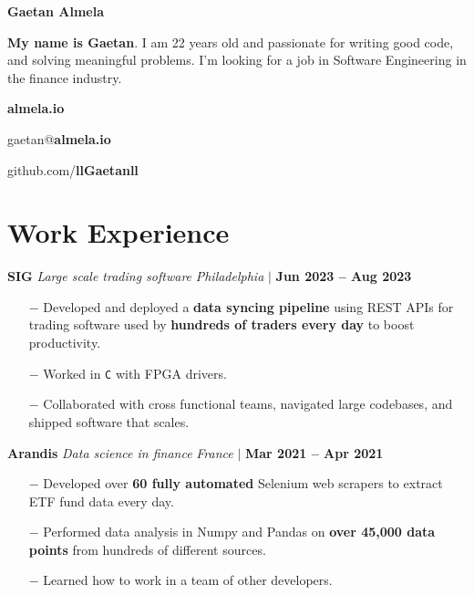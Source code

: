 \documentclass[12pt]{article}
\newcommand{\bigtitle}[5]{
  {\bf \large #1} \textemdash{} {\large \it #2} \hfill {#3}

  {\small #4}

  \smallskip

  {#5} %

  \medskip
}
\begin{document}
    {\fontsize{40}{50} \selectfont \bf \intertabular Gaetan Almela}

    \smallskip

    {\bf My name is Gaetan}. I am 22 years old and passionate for writing good
    code, and solving meaningful problems. I'm looking for a job in Software
    Engineering in the finance industry.

    \begin{center}
      \begin{multicols}{3}
       {\bf almela.io}

       gaetan@{\bf almela.io}

       github.com/{\bf llGaetanll}
      \end{multicols}
    \end{center}

    \section{Work Experience}

    \smallskip

    \bigtitle{SIG}{Large scale trading software}
    {
      \textit{Philadelphia} $\big|$ \textbf{Jun 2023 -- Aug 2023}
    }
    {}
    {
      \begin{itemize}
        \item[$-$] Developed and deployed a {\bf data syncing pipeline} using
          REST APIs for trading software used by {\bf hundreds of traders every
          day} to boost productivity.
        \item[$-$] Worked in \texttt{C} with FPGA drivers.
        \item[$-$] Collaborated with cross functional teams, navigated large
          codebases, and shipped software that scales.
      \end{itemize}
    }

    \bigtitle{Arandis}{Data science in finance}
    {
      \textit{France} $\big|$ \textbf{Mar 2021 -- Apr 2021}
    }
    {}
    {
      \begin{itemize}
        \item[$-$] Developed over {\bf 60 fully automated} Selenium web scrapers to extract
              ETF fund data every day.
        \item[$-$] Performed data analysis in Numpy and Pandas on {\bf over
              45,000 data points} from hundreds of different sources.
        \item[$-$] Learned how to work in a team of other developers.
      \end{itemize}
    }
\end{document}
